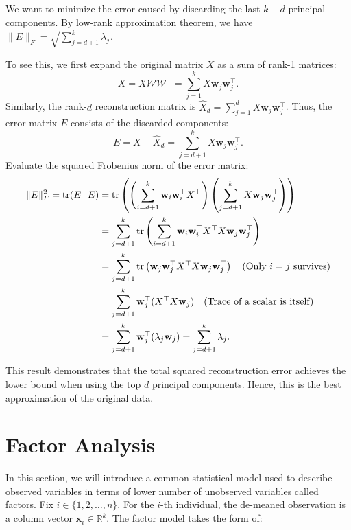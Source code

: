 \documentclass[12pt]{article}
\begin{document}
We want to minimize the error caused by discarding the last $k-d$ principal components. 
By low-rank approximation theorem, we have $\|E\|_F=\sqrt{\displaystyle\sum_{j=d+1}^k \lambda_j}.$

To see this, we first expand the original matrix $X$ as a sum of rank-1 matrices:
\begin{equation*}
X = X \mathcal{W} \mathcal{W}^\top = \sum_{j=1}^k X \mathbf{w}_j \mathbf{w}_j^\top.
\end{equation*}
Similarly, the rank-$d$ reconstruction matrix is $\widehat{X}_d = \displaystyle\sum_{j=1}^d X \mathbf{w}_j \mathbf{w}_j^\top$. Thus, the error matrix $E$ consists of the discarded components:
\begin{equation*}
E = X - \widehat{X}_d = \sum_{j=d+1}^k X \mathbf{w}_j \mathbf{w}_j^\top.
\end{equation*}
Evaluate the squared Frobenius norm of the error matrix:
\begin{align*}
\|E\|_F^2 = \operatorname{tr}(E^\top E) &= \operatorname{tr} \left( \left( \sum_{i=d+1}^k \mathbf{w}_i \mathbf{w}_i^\top X^\top \right) \left( \sum_{j=d+1}^k X \mathbf{w}_j \mathbf{w}_j^\top \right) \right) \\
&= \sum_{j=d+1}^k \operatorname{tr} \left( \sum_{i=d+1}^k \mathbf{w}_i \mathbf{w}_i^\top X^\top X \mathbf{w}_j \mathbf{w}_j^\top \right)  \\
&= \sum_{j=d+1}^k \operatorname{tr} \left( \mathbf{w}_j\mathbf{w}_j^\top X^\top X \mathbf{w}_j \mathbf{w}_j^\top \right) \quad \text{(Only $i=j$ survives)} \\
&= \sum_{j=d+1}^k \mathbf{w}_j^\top (X^\top X \mathbf{w}_j) \quad \text{(Trace of a scalar is itself)}\\ 
&= \sum_{j=d+1}^k \mathbf{w}_j^\top (\lambda_j \mathbf{w}_j) = \sum_{j=d+1}^k \lambda_j.
\end{align*}

This result demonstrates that the total squared reconstruction error achieves the lower bound when using the top $d$ principal components.
Hence, this is the best approximation of the original data.


\section{Factor Analysis}

In this section, we will introduce a common statistical model used to describe observed variables in terms of lower number of unobserved variables called factors.
Fix $i\in\{1,2,\ldots,n\}$. For the $i$-th individual, the de-meaned observation is a column vector $\mathbf{x}_i \in \mathbb{R}^k$. The factor model takes the form of:
\end{document}
